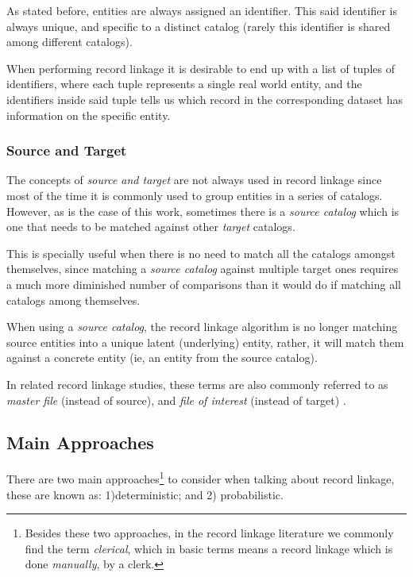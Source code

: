 \documentclass[epsfig,a4paper,11pt,titlepage,twoside,openany]{book}
\begin{document}
\hfill 

As stated before, entities are always assigned an identifier. This said identifier is always unique, and specific to a distinct catalog (rarely this identifier is shared among different catalogs). 

When performing record linkage it is desirable to end up with a list of tuples of identifiers, where each tuple represents a single real world entity, and the identifiers inside said tuple tells us which record in the corresponding dataset has information on the specific entity.


\subsubsection{Source and Target}
\label{sec:rl-term-source-and-target}

The concepts of \textit{source and target} are not always used in record linkage
since most of the time it is commonly used to group entities in a series of catalogs.
However, as is the case of this work, sometimes there is a \textit{source
  catalog} which is one that needs to be matched against other \textit{target} catalogs.


This is specially useful when there is no need to match all the catalogs amongst
themselves, since matching a \textit{source catalog} against multiple target ones
requires a much more diminished number of comparisons than it would do if matching all catalogs among themselves.

When using a \textit{source catalog}, the record linkage algorithm is no longer matching
source entities into a unique latent (underlying) entity, rather, it will match
them against a concrete entity (ie, an entity from the source catalog).

In related record linkage studies, these terms are also commonly referred to as \cite{Sayers2015}
\textit{master file} (instead of source), and \textit{file of interest} (instead
of target) .
   


\subsection{Main Approaches}
\label{sec:rl-main-approaches}

There are two main approaches\footnote{Besides these two approaches, in the record linkage literature we commonly find the term \textit{clerical}, which in basic terms means a record linkage which is done \textit{manually}, by a clerk.} to consider when talking about record linkage, these are known as: 1)deterministic; and 2) probabilistic. 
\end{document}
